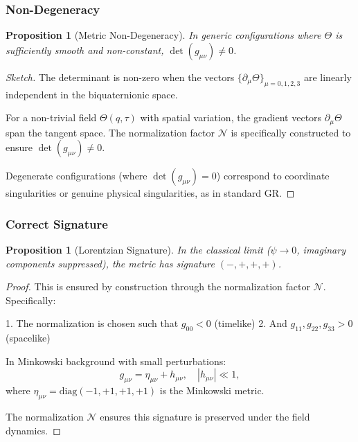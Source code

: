 \documentclass[12pt]{article}
\newtheorem{proposition}[theorem]{Proposition}
\theoremstyle{definition}
\theoremstyle{remark}
\begin{document}
\subsubsection{Non-Degeneracy}

\begin{proposition}[Metric Non-Degeneracy]
In generic configurations where $\Theta$ is sufficiently smooth and non-constant, $\det(g_{\mu\nu}) \neq 0$.
\end{proposition}

\begin{proof}[Sketch]
The determinant is non-zero when the vectors $\{\partial_\mu \Theta\}_{\mu=0,1,2,3}$ are linearly independent in the biquaternionic space.

For a non-trivial field $\Theta(q,\tau)$ with spatial variation, the gradient vectors $\partial_\mu \Theta$ span the tangent space. The normalization factor $\mathcal{N}$ is specifically constructed to ensure $\det(g_{\mu\nu}) \neq 0$.

Degenerate configurations (where $\det(g_{\mu\nu}) = 0$) correspond to coordinate singularities or genuine physical singularities, as in standard GR.
\end{proof}

\subsubsection{Correct Signature}

\begin{proposition}[Lorentzian Signature]
In the classical limit ($\psi \to 0$, imaginary components suppressed), the metric has signature $(-,+,+,+)$.
\end{proposition}

\begin{proof}
This is ensured by construction through the normalization factor $\mathcal{N}$. Specifically:

1. The normalization is chosen such that $g_{00} < 0$ (timelike)
2. And $g_{11}, g_{22}, g_{33} > 0$ (spacelike)

In Minkowski background with small perturbations:
\begin{equation}
g_{\mu\nu} = \eta_{\mu\nu} + h_{\mu\nu}, \quad |h_{\mu\nu}| \ll 1,
\end{equation}
where $\eta_{\mu\nu} = \text{diag}(-1,+1,+1,+1)$ is the Minkowski metric.

The normalization $\mathcal{N}$ ensures this signature is preserved under the field dynamics.
\end{proof}
\end{document}
